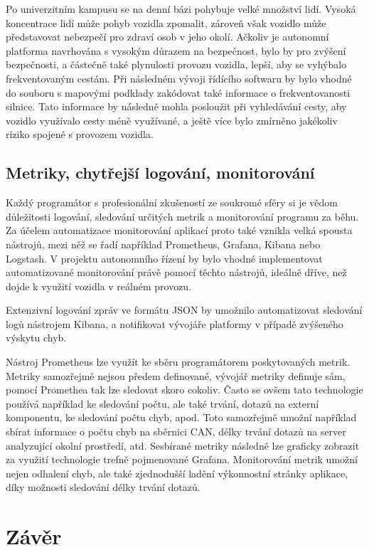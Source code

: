 \documentclass[czech, bachelor]{diploma}
\begin{document}
Po univerzitním kampusu se na denní bázi pohybuje velké množství lidí. Vysoká koncentrace lidí může pohyb vozidla zpomalit,
zároveň však vozidlo může představovat nebezpečí pro zdraví osob v jeho okolí. Ačkoliv je autonomní platforma navrhována s vysokým
důrazem na bezpečnost, bylo by pro zvýšení bezpečnosti, a částečně také plynulosti provozu vozidla, lepší, aby se vyhýbalo
frekventovaným cestám. Při následném vývoji řídícího softwaru by bylo vhodné do souboru s mapovými podklady zakódovat také
informace o frekventovanosti silnice. Tato informace by následně mohla posloužit při vyhledávání cesty, aby vozidlo využívalo
cesty méně využívané, a ještě více bylo zmírněno jakékoliv riziko spojené s provozem vozidla.

\section{Metriky, chytřejší logování, monitorování}

Každý programátor s profesionální zkušeností ze soukromé sféry si je vědom důležitosti logování, sledování určitých metrik
a monitorování programu za běhu. Za účelem automatizace monitorování aplikací proto také vznikla velká spousta nástrojů, mezi něž
se řadí například Prometheus, Grafana, Kibana nebo Logstash. V projektu autonomního řízení by bylo vhodné implementovat
automatizované monitorování právě pomocí těchto nástrojů, ideálně dříve, než dojde k využití vozidla v reálném provozu.

Extenzivní logování zpráv ve formátu JSON by umožnilo automatizovat sledování logů nástrojem Kibana, a notifikovat vývojáře
platformy v případě zvýšeného výskytu chyb.

Nástroj Prometheus lze využít ke sběru programátorem poskytovaných metrik. Metriky samozřejmě nejsou předem definované, vývojář
metriky definuje sám, pomocí Promethea tak lze sledovat skoro cokoliv. Často se ovšem tato technologie používá například
ke sledování počtu, ale také trvání, dotazů na externí komponentu, ke sledování počtu chyb, apod. Toto samozřejmě umožní například
sbírat informace o počtu chyb na sběrnici CAN, délky trvání dotazů na server analyzující okolní prostředí, atd. Sesbírané metriky
následně lze graficky zobrazit za využití technologie trefně pojmenované Grafana. Monitorování metrik umožní nejen odhalení chyb,
ale také zjednodušší ladění výkonnostní stránky aplikace, díky možnosti sledování délky trvání dotazů.

\chapter{Závěr}
\end{document}
